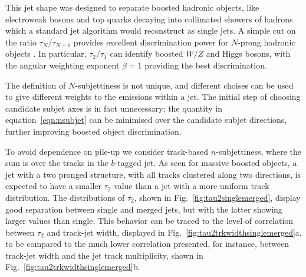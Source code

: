 This jet shape was designed to separate boosted hadronic objects, like electroweak bosons and top quarks decaying into collimated showers of hadrons which a standard jet algorithm would reconstruct as single jets. %
A simple cut on the ratio $\tau_N/\tau_{N-1}$ provides excellent discrimination power for $N$-prong hadronic objects\cite{nsubjettiness} . In particular, $\tau_2/\tau_1$ can identify boosted $W/Z$ and Higgs bosons, with the angular weighting exponent $\beta =1$ providing the best discrimination.

The definition of $N$-subjettiness is not unique, and different choises can be used to give different weights to the emissions within a jet. The initial step of choosing candidate subjet axes is in fact unnecessary; the quantity in equation~\ref{eqn:nsubjet} can be minimised over the candidate subjet directions, further improving boosted object discrimination.




To avoid dependence on pile-up we consider track-based $n$-subjettiness, where the sum 
 is over the tracks in the $b$-tagged jet. As seen for massive boosted objects, a jet with a two pronged structure, with all tracks clustered along two directions, is expected to have a smaller $\tau_2$ value than a jet with a more uniform track distribution. The distributions of $\tau_2$, shown in Fig.~\ref{fig:tau2singlemerged}, display good separation between single and merged jets, but with the latter showing larger values than single. 
This behavior can be traced to the level of correlation between $\tau_2$ and track-jet width, displayed in Fig.~\ref{fig:tau2trkwidthsinglemerged}a, to be compared to the much lower correlation presented, for instance, between track-jet width and the jet track multiplicity, shown in  Fig.~\ref{fig:tau2trkwidthsinglemerged}b. 

